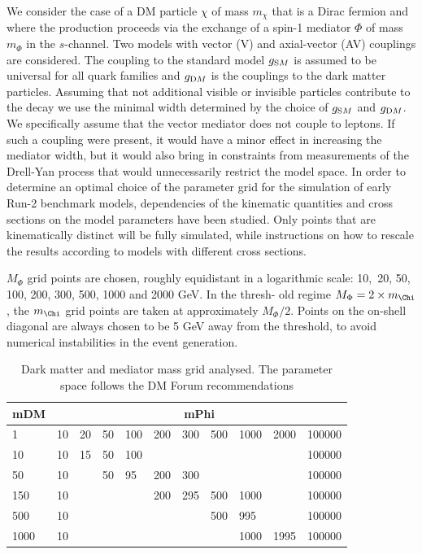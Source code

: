 We consider the case of a DM particle $\chi$ of mass $m_{\chi}$ that is a Dirac fermion and where the production proceeds via the exchange
of a spin-1 mediator $\Phi$ of mass $m_{\Phi}$ in the $s$-channel. Two models with vector (V) and axial-vector (AV) couplings are considered. The coupling to the standard model
$g_{\textrm SM}$ is assumed to be universal for all quark families and $g_{\textrm DM}$ is the couplings to the dark matter particles. Assuming that not additional visible or invisible particles contribute to the decay we use the minimal width determined by the choice of $g_{\textrm SM}$ and $g_{\textrm DM}$.
We specifically assume that the vector mediator does not couple to leptons. If such a coupling were present, it would have a minor effect in increasing the mediator width, but it
would also bring in constraints from measurements of the Drell-Yan process that would unnecessarily restrict the model space. 
 In order to determine an optimal choice of the parameter grid for the simulation of early Run-2 benchmark models, dependencies of the kinematic quantities and cross sections on the model parameters
have been studied. Only points that are kinematically distinct will be fully simulated, while instructions on how to rescale the results
according to models with different cross sections. 


$M_{\Phi}$ grid points are chosen, roughly equidistant in a logarithmic scale: 10,~20, 50, 100, 200, 300, 500, 1000 and 2000 GeV. In the thresh-
old regime $M_{\Phi} = 2 \times m_{\Chi}$, the $ m_{\Chi}$ grid points are taken at approximately $M_{\Phi}/2$. Points on the on-shell diagonal are always chosen to be
5 GeV away from the threshold, to avoid numerical instabilities in the event generation. 


\begin{table}[h]
\centering
\begin{tabular}{l|llllllllll}\hline
mDM  & \multicolumn{10}{c}{mPhi}                                   \\ \hline
1    & 10 & 20 & 50 & 100 & 200 & 300 & 500 & 1000 & 2000 & 100000 \\
10   & 10 & 15 & 50 & 100 &     &     &     &      &      & 100000 \\
50   & 10 &    & 50 & 95  & 200 & 300 &     &      &      & 100000 \\
150  & 10 &    &    &     & 200 & 295 & 500 & 1000 &      & 100000 \\
500  & 10 &    &    &     &     &     & 500 & 995  &      & 100000 \\
1000 & 10 &    &    &     &     &     &     & 1000 & 1995 & 100000\\ \hline
\end{tabular}
\caption{Dark matter and mediator mass grid analysed. The parameter space follows the DM Forum recommendations}
\label{tab:DMgrid}
\end{table}

